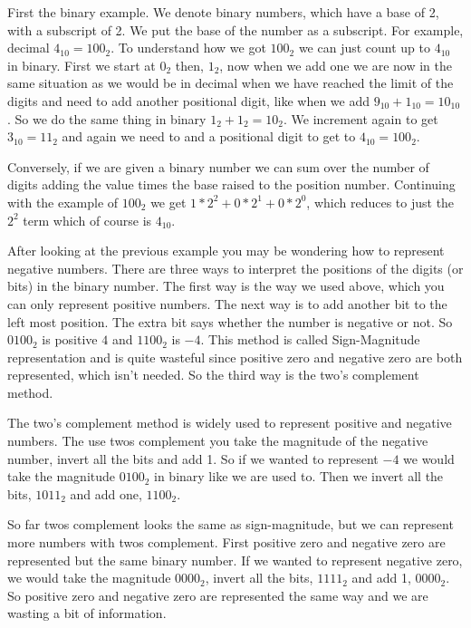 First the binary example. We denote binary numbers, which have a base of 2, with a subscript of 2. We put the base of the number as a subscript. For example, decimal $4_{10} = {100}_2$. To understand how we got ${100}_2$ we can just count up to $4_{10}$ in binary. First we start at $0_{2}$ then, $1_2$, now when we add one we are now in the same situation as we would be in decimal when we have reached the limit of the digits and need to add another positional digit, like when we add $9_{10} + 1_{10} = 10_{10}$. So we do the same thing in binary $1_2 + 1_2 = 10_2$. We increment again to get $3_{10} = 11_2$ and again we need to and a positional digit to get to $4_{10} = 100_2$.

Conversely, if we are given a binary number we can sum over the number of digits adding the value times the base raised to the position number. Continuing with the example of $100_2$ we get $1*2^2 + 0*2^1 + 0*2^0$, which reduces to just the $2^2$ term which of course is $4_{10}$.
	
After looking at the previous example you may be wondering how to represent negative numbers. There are three ways to interpret the positions of the digits (or bits) in the binary number. The first way is the way we used above, which you can only represent positive numbers. The next way is to add another bit to the left most position. The extra bit says whether the number is negative or not. So $0100_2$ is positive $4$ and $1100_2$ is $-4$. This method is called Sign-Magnitude representation and is quite wasteful since positive zero and negative zero are both represented, which isn't needed. So the third way is the two's complement method.	
	
The two's complement method is widely used to represent positive and negative numbers. The use twos complement you take the magnitude of the negative number, invert all the bits and add 1. So if we wanted to represent $-4$ we would take the magnitude $0100_2$ in binary like we are used to. Then we invert all the bits, $1011_2$ and add one, $1100_2$.	
	
So far twos complement looks the same as sign-magnitude, but we can represent more numbers with twos complement. First positive zero and negative zero are represented but the same binary number. If we wanted to represent negative zero, we would take the magnitude $0000_2$, invert all the bits, $1111_2$ and add 1, $0000_2$. So positive zero and negative zero are represented the same way and we are wasting a bit of information.
	
